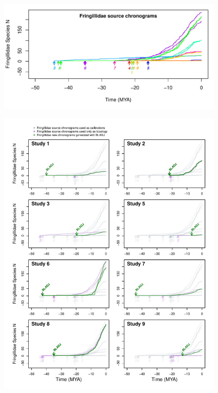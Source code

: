 \documentclass[11pt,]{article}
\begin{document}
\newpage

\begin{figure}[!h]
\includegraphics{fig_schronograms1.pdf}
\caption{}
\label{fig:schronograms}
\end{figure}

\newpage

\begin{figure}[!ht]
\includegraphics{fig_crossval_bladj.pdf}
\caption{}
\label{fig:cvbladj}
\end{figure}





\newpage
\singlespacing 

\end{document}
